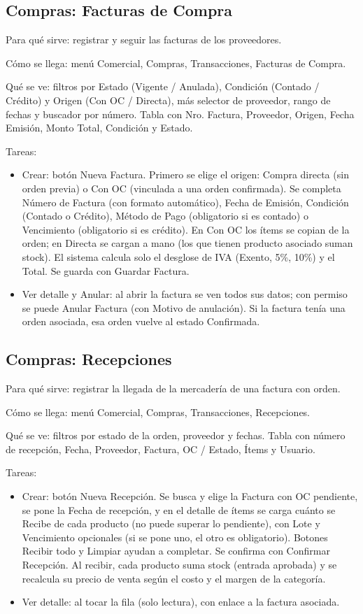 \subsection{Compras: Facturas de Compra}
\label{sec:mu-compras-facturas}

Para qué sirve: registrar y seguir las facturas de los proveedores.

Cómo se llega: menú Comercial, Compras, Transacciones, Facturas de Compra.

Qué se ve: filtros por Estado (Vigente / Anulada), Condición (Contado / Crédito) y Origen (Con OC / Directa), más selector de proveedor, rango de fechas y buscador por número. Tabla con Nro. Factura, Proveedor, Origen, Fecha Emisión, Monto Total, Condición y Estado.

Tareas:
\begin{itemize}
  \item Crear: botón Nueva Factura. Primero se elige el origen: Compra directa (sin orden previa) o Con OC (vinculada a una orden confirmada). Se completa Número de Factura (con formato automático), Fecha de Emisión, Condición (Contado o Crédito), Método de Pago (obligatorio si es contado) o Vencimiento (obligatorio si es crédito). En Con OC los ítems se copian de la orden; en Directa se cargan a mano (los que tienen producto asociado suman stock). El sistema calcula solo el desglose de IVA (Exento, 5\%, 10\%) y el Total. Se guarda con Guardar Factura.
  \item Ver detalle y Anular: al abrir la factura se ven todos sus datos; con permiso se puede Anular Factura (con Motivo de anulación). Si la factura tenía una orden asociada, esa orden vuelve al estado Confirmada.
\end{itemize}

\subsection{Compras: Recepciones}
\label{sec:mu-compras-recepciones}

Para qué sirve: registrar la llegada de la mercadería de una factura con orden.

Cómo se llega: menú Comercial, Compras, Transacciones, Recepciones.

Qué se ve: filtros por estado de la orden, proveedor y fechas. Tabla con número de recepción, Fecha, Proveedor, Factura, OC / Estado, Ítems y Usuario.

Tareas:
\begin{itemize}
  \item Crear: botón Nueva Recepción. Se busca y elige la Factura con OC pendiente, se pone la Fecha de recepción, y en el detalle de ítems se carga cuánto se Recibe de cada producto (no puede superar lo pendiente), con Lote y Vencimiento opcionales (si se pone uno, el otro es obligatorio). Botones Recibir todo y Limpiar ayudan a completar. Se confirma con Confirmar Recepción. Al recibir, cada producto suma stock (entrada aprobada) y se recalcula su precio de venta según el costo y el margen de la categoría.
  \item Ver detalle: al tocar la fila (solo lectura), con enlace a la factura asociada.
\end{itemize}

